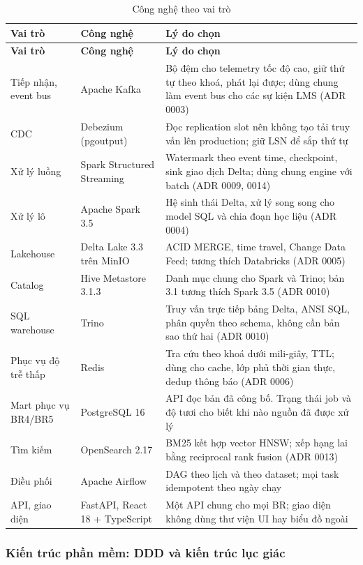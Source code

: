 {\small
\begin{longtable}{@{}L{3.2cm}L{3.4cm}L{7.9cm}@{}}
\caption{Công nghệ theo vai trò}\label{tab:tech}\\
\toprule
\textbf{Vai trò} & \textbf{Công nghệ} & \textbf{Lý do chọn} \\
\midrule
\endfirsthead
\toprule
\textbf{Vai trò} & \textbf{Công nghệ} & \textbf{Lý do chọn} \\
\midrule
\endhead
Tiếp nhận, event bus & Apache Kafka & Bộ đệm cho telemetry tốc độ cao, giữ thứ tự theo khoá, phát lại được; dùng chung làm event bus cho các sự kiện LMS (ADR 0003) \\
CDC & Debezium (pgoutput) & Đọc replication slot nên không tạo tải truy vấn lên production; giữ LSN để sắp thứ tự \\
Xử lý luồng & Spark Structured Streaming & Watermark theo event time, checkpoint, sink giao dịch Delta; dùng chung engine với batch (ADR 0009, 0014) \\
Xử lý lô & Apache Spark 3.5 & Hệ sinh thái Delta, xử lý song song cho model SQL và chia đoạn học liệu (ADR 0004) \\
Lakehouse & Delta Lake 3.3 trên MinIO & ACID MERGE, time travel, Change Data Feed; tương thích Databricks (ADR 0005) \\
Catalog & Hive Metastore 3.1.3 & Danh mục chung cho Spark và Trino; bản 3.1 tương thích Spark 3.5 (ADR 0010) \\
SQL warehouse & Trino & Truy vấn trực tiếp bảng Delta, ANSI SQL, phân quyền theo schema, không cần bản sao thứ hai (ADR 0010) \\
Phục vụ độ trễ thấp & Redis & Tra cứu theo khoá dưới mili-giây, TTL; dùng cho cache, lớp phủ thời gian thực, dedup thông báo (ADR 0006) \\
Mart phục vụ BR4/BR5 & PostgreSQL 16 & API đọc bản đã công bố. Trạng thái job và độ tươi cho biết khi nào nguồn đã được xử lý \\
Tìm kiếm & OpenSearch 2.17 & BM25 kết hợp vector HNSW; xếp hạng lai bằng reciprocal rank fusion (ADR 0013) \\
Điều phối & Apache Airflow & DAG theo lịch và theo dataset; mọi task idempotent theo ngày chạy \\
API, giao diện & FastAPI, React 18 + TypeScript & Một API chung cho mọi BR; giao diện không dùng thư viện UI hay biểu đồ ngoài \\
\bottomrule
\end{longtable}}

\subsubsection{Kiến trúc phần mềm: DDD và kiến trúc lục giác}

